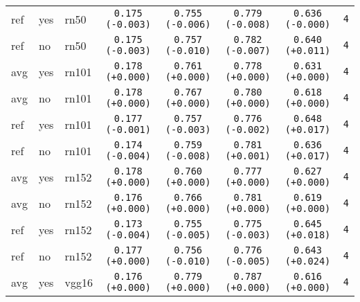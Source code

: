 \begin{tabular}{|l|l|l|c|c|c|c|c|}
\hline
ref & yes & rn50 & \texttt{0.175 {\color{red}(-0.003)}} & \texttt{0.755 {\color{green}(-0.006)}} & \texttt{0.779 {\color{green}(-0.008)}} & \texttt{0.636 {\color{black}(-0.000)}} & \texttt{4} \\
ref & no & rn50 & \texttt{0.175 {\color{red}(-0.003)}} & \texttt{0.757 {\color{green}(-0.010)}} & \texttt{0.782 {\color{green}(-0.007)}} & \texttt{0.640 {\color{green}(+0.011)}} & \texttt{4} \\
\hline
\rowcolor{verylightgray}avg & yes & rn101 & \texttt{0.178 {\color{black}(+0.000)}} & \texttt{0.761 {\color{black}(+0.000)}} & \texttt{0.778 {\color{black}(+0.000)}} & \texttt{0.631 {\color{black}(+0.000)}} & \texttt{4} \\
\rowcolor{verylightgray}avg & no & rn101 & \texttt{0.178 {\color{black}(+0.000)}} & \texttt{0.767 {\color{black}(+0.000)}} & \texttt{0.780 {\color{black}(+0.000)}} & \texttt{0.618 {\color{black}(+0.000)}} & \texttt{4} \\
\hline
ref & yes & rn101 & \texttt{0.177 {\color{red}(-0.001)}} & \texttt{0.757 {\color{green}(-0.003)}} & \texttt{0.776 {\color{green}(-0.002)}} & \texttt{0.648 {\color{green}(+0.017)}} & \texttt{4} \\
ref & no & rn101 & \texttt{0.174 {\color{red}(-0.004)}} & \texttt{0.759 {\color{green}(-0.008)}} & \texttt{0.781 {\color{red}(+0.001)}} & \texttt{0.636 {\color{green}(+0.017)}} & \texttt{4} \\
\hline
\rowcolor{verylightgray}avg & yes & rn152 & \texttt{0.178 {\color{black}(+0.000)}} & \texttt{0.760 {\color{black}(+0.000)}} & \texttt{0.777 {\color{black}(+0.000)}} & \texttt{0.627 {\color{black}(+0.000)}} & \texttt{4} \\
\rowcolor{verylightgray}avg & no & rn152 & \texttt{0.176 {\color{black}(+0.000)}} & \texttt{0.766 {\color{black}(+0.000)}} & \texttt{0.781 {\color{black}(+0.000)}} & \texttt{0.619 {\color{black}(+0.000)}} & \texttt{4} \\
\hline
ref & yes & rn152 & \texttt{0.173 {\color{red}(-0.004)}} & \texttt{0.755 {\color{green}(-0.005)}} & \texttt{0.775 {\color{green}(-0.003)}} & \texttt{0.645 {\color{green}(+0.018)}} & \texttt{4} \\
ref & no & rn152 & \texttt{0.177 {\color{black}(+0.000)}} & \texttt{0.756 {\color{green}(-0.010)}} & \texttt{0.776 {\color{green}(-0.005)}} & \texttt{0.643 {\color{green}(+0.024)}} & \texttt{4} \\
\hline
\rowcolor{verylightgray}avg & yes & vgg16 & \texttt{0.176 {\color{black}(+0.000)}} & \texttt{0.779 {\color{black}(+0.000)}} & \texttt{0.787 {\color{black}(+0.000)}} & \texttt{0.616 {\color{black}(+0.000)}} & \texttt{4} \\

\end{tabular}
